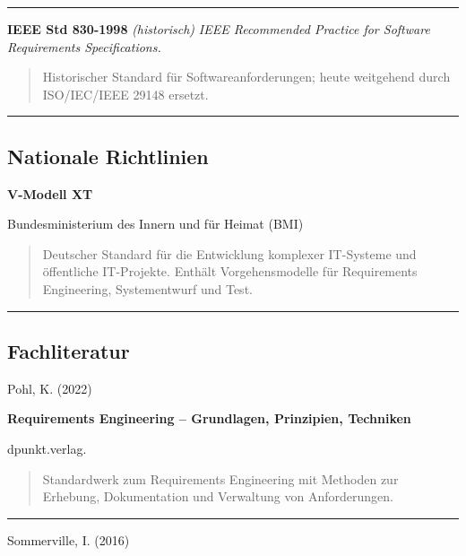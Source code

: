 \documentclass[
  a4paper,
  12pt,
  DIV=12,        %
  parskip=half,  %
  headings=small %
]{scrartcl}
\theoremstyle{definition}
\theoremstyle{definition}
\begin{document}
\begin{center}\rule{0.5\linewidth}{0.5pt}\end{center}

\textbf{IEEE Std 830-1998} \emph{(historisch)} \emph{IEEE Recommended
Practice for Software Requirements Specifications.}

\begin{quote}
Historischer Standard für Softwareanforderungen; heute weitgehend durch
ISO/IEC/IEEE 29148 ersetzt.
\end{quote}

\begin{center}\rule{0.5\linewidth}{0.5pt}\end{center}

\subsection{Nationale Richtlinien}\label{nationale-richtlinien}

\textbf{V-Modell XT}

Bundesministerium des Innern und für Heimat (BMI)

\begin{quote}
Deutscher Standard für die Entwicklung komplexer IT-Systeme und
öffentliche IT-Projekte. Enthält Vorgehensmodelle für Requirements
Engineering, Systementwurf und Test.
\end{quote}

\begin{center}\rule{0.5\linewidth}{0.5pt}\end{center}

\subsection{Fachliteratur}\label{fachliteratur}

Pohl, K. (2022)

\textbf{Requirements Engineering -- Grundlagen, Prinzipien, Techniken}

dpunkt.verlag.

\begin{quote}
Standardwerk zum Requirements Engineering mit Methoden zur Erhebung,
Dokumentation und Verwaltung von Anforderungen.
\end{quote}

\begin{center}\rule{0.5\linewidth}{0.5pt}\end{center}

Sommerville, I. (2016)
\end{document}
